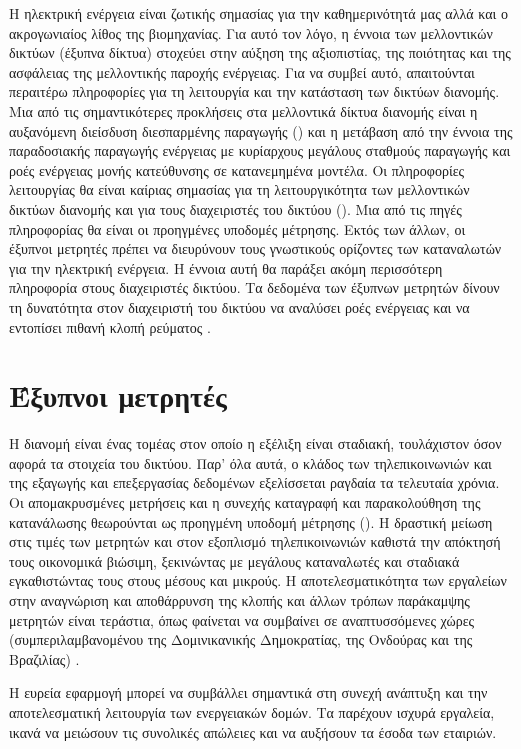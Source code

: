 Η ηλεκτρική ενέργεια είναι ζωτικής σημασίας για την καθημερινότητά μας αλλά και ο ακρογωνιαίος λίθος της βιομηχανίας. Για αυτό τον λόγο, η έννοια των μελλοντικών δικτύων (έξυπνα δίκτυα) στοχεύει στην αύξηση της αξιοπιστίας, της ποιότητας και της ασφάλειας της μελλοντικής παροχής ενέργειας. Για να συμβεί αυτό, απαιτούνται περαιτέρω πληροφορίες για τη λειτουργία και την κατάσταση των δικτύων διανομής. Μια από τις σημαντικότερες προκλήσεις στα μελλοντικά δίκτυα διανομής είναι η αυξανόμενη διείσδυση διεσπαρμένης παραγωγής () και η μετάβαση από την έννοια της παραδοσιακής παραγωγής ενέργειας με κυρίαρχους μεγάλους σταθμούς παραγωγής και ροές ενέργειας μονής κατεύθυνσης σε κατανεμημένα μοντέλα. Οι πληροφορίες λειτουργίας θα είναι καίριας σημασίας για τη λειτουργικότητα των μελλοντικών δικτύων διανομής και για τους διαχειριστές του δικτύου (). Μια από τις πηγές πληροφορίας θα είναι οι προηγμένες υποδομές μέτρησης. Εκτός των άλλων, οι έξυπνοι μετρητές πρέπει να διευρύνουν τους γνωστικούς ορίζοντες των καταναλωτών για την ηλεκτρική ενέργεια. Η έννοια αυτή θα παράξει ακόμη περισσότερη πληροφορία στους διαχειριστές δικτύου. Τα δεδομένα των έξυπνων μετρητών δίνουν τη δυνατότητα στον διαχειριστή του δικτύου να αναλύσει ροές ενέργειας και να εντοπίσει πιθανή κλοπή ρεύματος \cite{netherlands}. \\
\section{Έξυπνοι μετρητές}
Η διανομή είναι ένας τομέας στον οποίο η εξέλιξη είναι σταδιακή, τουλάχιστον όσον αφορά τα στοιχεία του δικτύου. Παρ' όλα αυτά, ο κλάδος των τηλεπικοινωνιών και της εξαγωγής και επεξεργασίας δεδομένων εξελίσσεται ραγδαία τα τελευταία χρόνια. Οι απομακρυσμένες μετρήσεις και η συνεχής καταγραφή και παρακολούθηση της κατανάλωσης θεωρούνται ως προηγμένη υποδομή μέτρησης (). Η δραστική μείωση στις τιμές των μετρητών και στον εξοπλισμό τηλεπικοινωνιών καθιστά την απόκτησή τους οικονομικά βιώσιμη, ξεκινώντας με μεγάλους καταναλωτές και σταδιακά εγκαθιστώντας τους στους μέσους και μικρούς. Η αποτελεσματικότητα των εργαλείων στην αναγνώριση και αποθάρρυνση της κλοπής και άλλων τρόπων παράκαμψης μετρητών είναι τεράστια, όπως φαίνεται να συμβαίνει σε αναπτυσσόμενες χώρες (συμπεριλαμβανομένου της Δομινικανικής Δημοκρατίας, της Ονδούρας και της Βραζιλίας) \cite{reduceloss}.\par
Η ευρεία εφαρμογή  μπορεί να συμβάλλει σημαντικά στη συνεχή ανάπτυξη και την αποτελεσματική λειτουργία των ενεργειακών δομών. Τα  παρέχουν ισχυρά εργαλεία, ικανά να μειώσουν τις συνολικές απώλειες και να αυξήσουν τα έσοδα των εταιριών.
